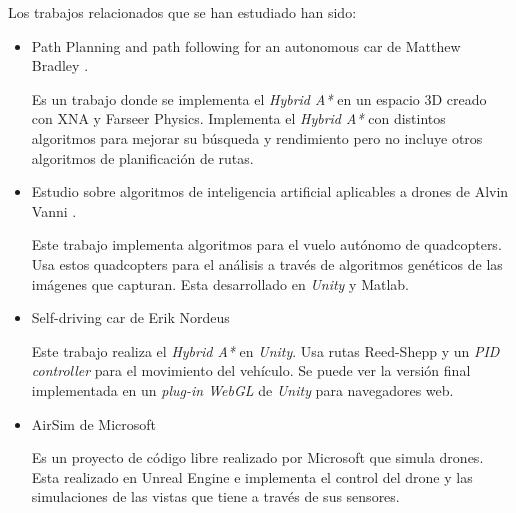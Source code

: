 

Los trabajos relacionados que se han estudiado han sido: 
\begin{itemize}
\item Path Planning and path following for an autonomous car de Matthew Bradley \cite{bradley2012path}.

Es un trabajo donde se implementa el \textit{Hybrid A*} en un espacio 3D creado con XNA y Farseer Physics. Implementa el \textit{Hybrid A*} con distintos algoritmos para mejorar su búsqueda y rendimiento pero no incluye otros algoritmos de planificación de rutas.

\item Estudio sobre algoritmos de inteligencia artificial aplicables a drones de Alvin Vanni \cite{vanni2016drones}.

Este trabajo implementa algoritmos para el vuelo autónomo de quadcopters. Usa estos quadcopters para el análisis a través de algoritmos genéticos de las imágenes que capturan. Esta desarrollado en \textit{Unity} y Matlab.

\item Self-driving car de Erik Nordeus \cite{nordeus}

Este trabajo realiza el \textit{Hybrid A*} en \textit{Unity}. Usa rutas Reed-Shepp y un \textit{PID controller} para el movimiento del vehículo. Se puede ver la versión final implementada en un \textit{plug-in WebGL} de \textit{Unity} para navegadores web.

\item AirSim de Microsoft \cite{msairsim}

Es un proyecto de código libre realizado por Microsoft que simula drones. Esta realizado en Unreal Engine e implementa el control del drone y las simulaciones de las vistas que tiene a través de sus sensores.
\end{itemize}
